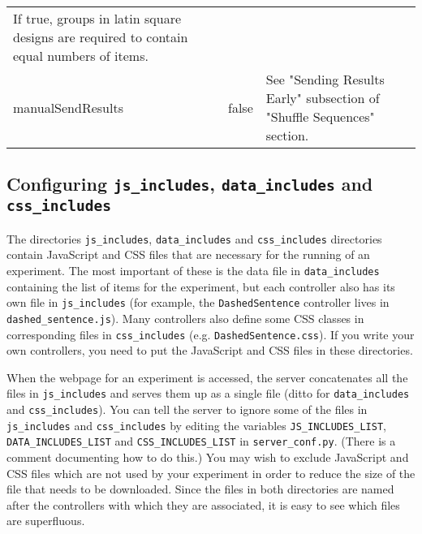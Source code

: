 \documentclass[
]{article}
\begin{document}
\begin{RaggedRight}
\begin{longtable}[]{p{1.7in}p{1in}p{3.15in}}
\begin{minipage}[t]{0.37\columnwidth}
If true, groups in latin square designs are required to contain equal
numbers of items.\strut
\end{minipage}\tabularnewline
\begin{minipage}[t]{0.26\columnwidth}\raggedright
manualSendResults\strut
\end{minipage} & \begin{minipage}[t]{0.28\columnwidth}\raggedright
false\strut
\end{minipage} & \begin{minipage}[t]{0.37\columnwidth}\raggedright
See "Sending Results Early" subsection of "Shuffle Sequences"
section.\strut
\end{minipage}\tabularnewline
\bottomrule
\end{longtable}\normalsize\end{RaggedRight}

\hypertarget{configuring-js_includes-data_includes-and-css_includes}{%
\subsection{\texorpdfstring{Configuring \texttt{js\_includes},
\texttt{data\_includes} and
\texttt{css\_includes}}{Configuring js\_includes, data\_includes and css\_includes}}\label{configuring-js_includes-data_includes-and-css_includes}}

The directories \texttt{js\_includes}, \texttt{data\_includes} and
\texttt{css\_includes} directories contain JavaScript and CSS files that
are necessary for the running of an experiment. The most important of
these is the data file in \texttt{data\_includes} containing the list of
items for the experiment, but each controller also has its own file in
\texttt{js\_includes} (for example, the \texttt{DashedSentence}
controller lives in \texttt{dashed\_sentence.js}). Many controllers also
define some CSS classes in corresponding files in \texttt{css\_includes}
(e.g. \texttt{DashedSentence.css}). If you write your own controllers,
you need to put the JavaScript and CSS files in these directories.

When the webpage for an experiment is accessed, the server concatenates
all the files in \texttt{js\_includes} and serves them up as a single
file (ditto for \texttt{data\_includes} and \texttt{css\_includes}). You
can tell the server to ignore some of the files in \texttt{js\_includes}
and \texttt{css\_includes} by editing the variables
\texttt{JS\_INCLUDES\_LIST}, \texttt{DATA\_INCLUDES\_LIST} and
\texttt{CSS\_INCLUDES\_LIST} in \texttt{server\_conf.py}. (There is a
comment documenting how to do this.) You may wish to exclude JavaScript
and CSS files which are not used by your experiment in order to reduce
the size of the file that needs to be downloaded. Since the files in
both directories are named after the controllers with which they are
associated, it is easy to see which files are superfluous.
\end{document}
